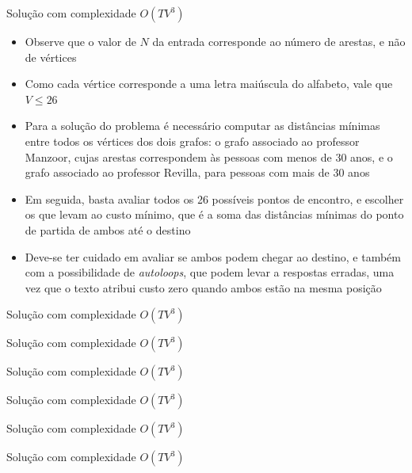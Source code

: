 \begin{frame}[fragile]{Solução com complexidade $O(TV^3)$}

    \begin{itemize}
        \item Observe que o valor de $N$ da entrada corresponde ao número de arestas, e não
            de vértices

        \item Como cada vértice corresponde a uma letra maiúscula do alfabeto, vale que
            $V \leq 26$

        \item Para a solução do problema é necessário computar as distâncias mínimas entre todos
            os vértices dos dois grafos: o grafo associado ao professor Manzoor, cujas
            arestas correspondem às pessoas com menos de 30 anos, e o grafo associado ao professor
            Revilla, para pessoas com mais de 30 anos
        
        \item Em seguida, basta avaliar todos os 26 possíveis pontos de 
            encontro, e escolher os que levam ao custo mínimo, que é a soma das distâncias
            mínimas do ponto de partida de ambos até o destino

        \item Deve-se ter cuidado em avaliar se ambos podem chegar ao destino, e também com
            a possibilidade de \textit{autoloops}, que podem levar a respostas erradas, uma
            vez que o texto atribui custo zero quando ambos estão na mesma posição
   \end{itemize}

\end{frame}

\begin{frame}[fragile]{Solução com complexidade $O(TV^3)$}
\end{frame}

\begin{frame}[fragile]{Solução com complexidade $O(TV^3)$}
\end{frame}

\begin{frame}[fragile]{Solução com complexidade $O(TV^3)$}
\end{frame}

\begin{frame}[fragile]{Solução com complexidade $O(TV^3)$}
\end{frame}

\begin{frame}[fragile]{Solução com complexidade $O(TV^3)$}
\end{frame}

\begin{frame}[fragile]{Solução com complexidade $O(TV^3)$}
\end{frame}
